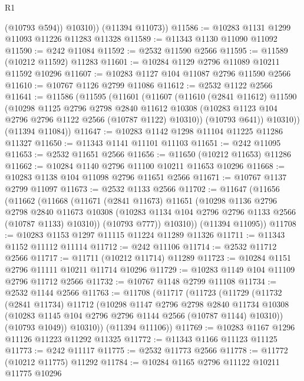 \begin{lexlean}{R1}
\begin{coremodule}
            (@10793 @594))
          @10310))
      (@11394 @11073))
@11586 := @10283 @1131 @1299 @11093 @11226 @11283 @11328
@11589 := @11343 @1130 @11090 @11092
@11590 := @242 @11084
@11592 := @2532 @11590 @2566
@11595 := @11589 (@10212 @11592) @11283
@11601 := @10284 @1129 @2796 @11089 @10211 @11592 @10296
@11607 := @10283 @1127 @104 @11087 @2796 @11590 @2566
@11610 := @10767 @1126 @2799 @11086
@11612 := @2532 @1122 @2566
@11641 := @11586
    (@11595
      (@11601
        (@11607
          (@11610
            (@2841 @11612)
            @11590
            (@10298
              @1125
              @2796
              @2798
              @2840
              @11612
              @10308
              (@10283 @1123 @104 @2796 @2796 @1122 @2566 (@10787 @1122) @10310))
            (@10793 @641))
          @10310))
      (@11394 @11084))
@11647 := @10283 @1142 @1298 @11104 @11225 @11286 @11327
@11650 := @11343 @1141 @11101 @11103
@11651 := @242 @11095
@11653 := @2532 @11651 @2566
@11656 := @11650 (@10212 @11653) @11286
@11662 := @10284 @1140 @2796 @11100 @10211 @11653 @10296
@11668 := @10283 @1138 @104 @11098 @2796 @11651 @2566
@11671 := @10767 @1137 @2799 @11097
@11673 := @2532 @1133 @2566
@11702 := @11647
    (@11656
      (@11662
        (@11668
          (@11671
            (@2841 @11673)
            @11651
            (@10298
              @1136
              @2796
              @2798
              @2840
              @11673
              @10308
              (@10283 @1134 @104 @2796 @2796 @1133 @2566 (@10787 @1133) @10310))
            (@10793 @777))
          @10310))
      (@11394 @11095))
@11708 := @10283 @1153 @1297 @11115 @11224 @11289 @11326
@11711 := @11343 @1152 @11112 @11114
@11712 := @242 @11106
@11714 := @2532 @11712 @2566
@11717 := @11711 (@10212 @11714) @11289
@11723 := @10284 @1151 @2796 @11111 @10211 @11714 @10296
@11729 := @10283 @1149 @104 @11109 @2796 @11712 @2566
@11732 := @10767 @1148 @2799 @11108
@11734 := @2532 @1144 @2566
@11763 := @11708
    (@11717
      (@11723
        (@11729
          (@11732
            (@2841 @11734)
            @11712
            (@10298
              @1147
              @2796
              @2798
              @2840
              @11734
              @10308
              (@10283 @1145 @104 @2796 @2796 @1144 @2566 (@10787 @1144) @10310))
            (@10793 @1049))
          @10310))
      (@11394 @11106))
@11769 := @10283 @1167 @1296 @11126 @11223 @11292 @11325
@11772 := @11343 @1166 @11123 @11125
@11773 := @242 @11117
@11775 := @2532 @11773 @2566
@11778 := @11772 (@10212 @11775) @11292
@11784 := @10284 @1165 @2796 @11122 @10211 @11775 @10296

\end{coremodule}
\end{lexlean}

